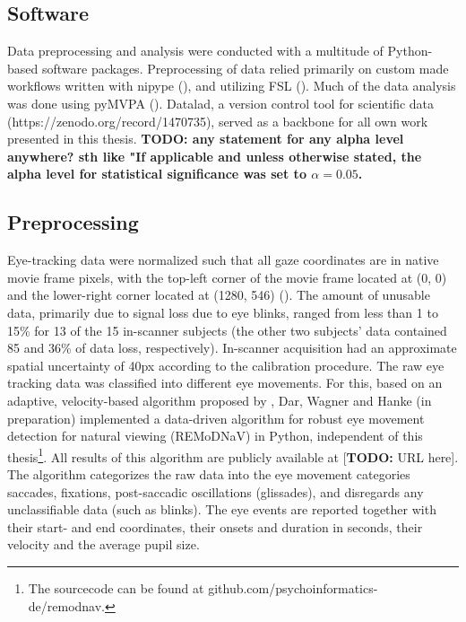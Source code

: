 \documentclass[a4paper, 12pt]{scrreprt}
\begin{document}
\subsection{Software}
Data preprocessing and analysis were conducted with a multitude of Python-based software packages. Preprocessing of data relied primarily on custom made workflows written with nipype (\cite{gorgolewski_krzysztof}), and utilizing FSL (\cite{jenkinson2012fsl}). Much of the data analysis was done using pyMVPA (\cite{hanke2009pymvpa}). Datalad, a version control tool for scientific data (https://zenodo.org/record/1470735), served as a backbone for all own work presented in this thesis. \textbf{TODO: any statement for any alpha level anywhere? sth like "If applicable and unless otherwise stated, the alpha level for statistical significance was set to $\alpha = 0.05$.}

\subsection{Preprocessing}
Eye-tracking data were normalized such that all gaze coordinates are in native movie frame pixels, with the top-left corner of the movie frame located at (0, 0) and the lower-right corner located at (1280, 546) (\cite{hanke2016studyforrest}). The amount of unusable data, primarily due to signal loss due to eye blinks, ranged from less than 1 to 15\% for 13 of the 15 in-scanner subjects (the other two subjects’ data contained 85 and 36\% of data loss, respectively). In-scanner acquisition had an approximate spatial uncertainty of 40px according to the calibration procedure. \newline
The raw eye tracking data was classified into different eye movements. For this, based on an adaptive, velocity-based algorithm proposed by \textcite{nystrom2010adaptive}, Dar, Wagner and  Hanke (in preparation) implemented a data-driven algorithm for robust eye movement detection for natural viewing (REMoDNaV) in Python, independent of this thesis\footnote{The sourcecode can be found at github.com/psychoinformatics-de/remodnav.}. All results of this algorithm are publicly available at [\textbf{TODO: }URL here]. The algorithm categorizes the raw data into the eye movement categories saccades, fixations, post-saccadic oscillations (glissades), and disregards any unclassifiable data (such as blinks). The eye events are reported together with their start- and end coordinates, their onsets and duration in seconds, their velocity and the average pupil size.
\end{document}

